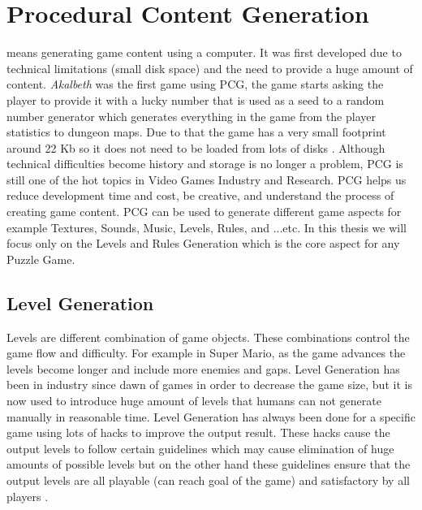 \section{Procedural Content Generation}
 means generating game content using a computer. It was first developed due to technical limitations (small disk space) and the need to provide a huge amount of content. \emph{Akalbeth} was the first game using PCG, the game starts asking the player to provide it with a lucky number that is used as a seed to a random number generator which generates everything in the game from the player statistics to dungeon maps. Due to that the game has a very small footprint around 22 Kb so it does not need to be loaded from lots of disks \cite{pcgFirstGame}. Although technical difficulties become history and storage is no longer a problem, PCG is still one of the hot topics in Video Games Industry and Research. PCG helps us reduce development time and cost, be creative, and understand the process of creating game content. PCG can be used to generate different game aspects for example Textures, Sounds, Music, Levels, Rules, and ...etc. In this thesis we will focus only on the Levels and Rules Generation which is the core aspect for any Puzzle Game.

\subsection{Level Generation}
Levels are different combination of game objects. These combinations control the game flow and difficulty. For example in Super Mario, as the game advances the levels become longer and include more enemies and gaps. Level Generation has been in industry since dawn of games in order to decrease the game size, but it is now used to introduce huge amount of levels that humans can not generate manually in reasonable time. Level Generation has always been done for a specific game using lots of hacks to improve the output result. These hacks cause the output levels to follow certain guidelines which may cause elimination of huge amounts of possible levels but on the other hand these guidelines ensure that the output levels are all playable (can reach goal of the game) and satisfactory by all players \cite{mcGenerateEverything}.

